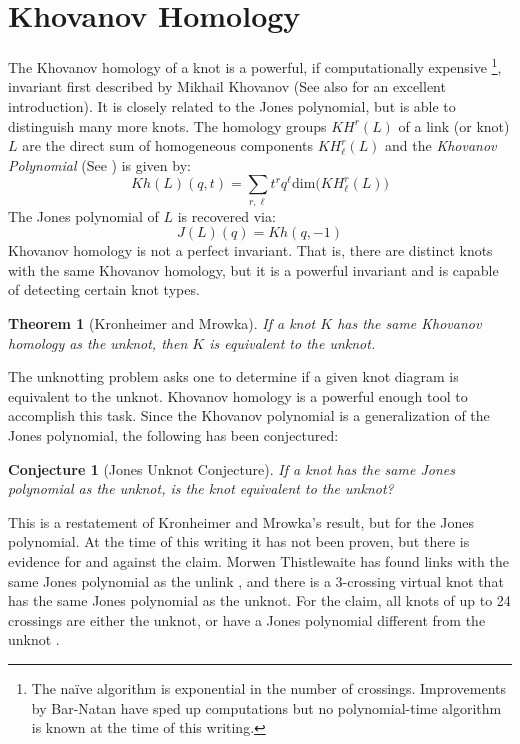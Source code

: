 \documentclass{article}
\theoremstyle{plain}
\newtheorem{theorem}{Theorem}
\newtheorem{conjecture}{Conjecture}
\begin{document}
	\section{Khovanov Homology}
	    The Khovanov homology of a knot is a powerful, if computationally
	    expensive%
	    \footnote{The na\"{i}ve algorithm is exponential in the number of
	    crossings. Improvements
	    by Bar-Natan \cite{Khovanov1999CatJonesPoly} have sped up computations
	    but no polynomial-time algorithm is known at the time of this writing.},
	    invariant first described by Mikhail Khovanov
	    \cite{Khovanov1999CatJonesPoly} (See also \cite{barnatan2002khovanov}
	    for an excellent introduction). It is closely related to the Jones
	    polynomial, but is able to distinguish many more knots. The homology
	    groups $KH^{r}(L)$ of a link (or knot) $L$ are the direct sum of
	    homogeneous components $KH_{\ell}^{r}(L)$ and the
	    \textit{Khovanov Polynomial} (See \cite{KatlasKhoHo}) is given by:
	    \begin{equation}
	        Kh(L)(q,t)=
	        \sum_{r,\ell}t^{r}q^{\ell}\textrm{dim}\big(KH_{\ell}^{r}(L)\big)
	    \end{equation}
	    The Jones polynomial of $L$ is recovered via:
	    \begin{equation}
	        J(L)(q)=Kh(q,-1)
	    \end{equation}
	    Khovanov homology is not a perfect invariant. That is, there are
	    distinct knots with the same Khovanov homology, but it is a powerful
	    invariant and is capable of detecting certain knot types.
	    \begin{theorem}[Kronheimer and Mrowka]
            If a knot $K$ has the same Khovanov homology as the unknot, then $K$
            is equivalent to the unknot.
	    \end{theorem}
	    The unknotting problem asks one to determine if a given knot diagram is
	    equivalent to the unknot. Khovanov homology is a powerful enough tool
	    to accomplish this task. Since the Khovanov polynomial is a
	    generalization of the Jones polynomial, the following has been
	    conjectured:
	    \begin{conjecture}[Jones Unknot Conjecture]
	        If a knot has the same Jones polynomial as the unknot, is the knot
	        equivalent to the unknot?
	    \end{conjecture}
	    This is a restatement of Kronheimer and Mrowka's result, but for the
	    Jones polynomial. At the time of this writing it has not been proven,
	    but there is evidence for and against the claim. Morwen Thistlewaite
	    has found links with the same Jones polynomial as the unlink
	    \cite{Thistlethwaite2001LINKSWT}, and there is a 3-crossing virtual
	    knot that has the same Jones polynomial as the unknot. For the claim,
	    all knots of up to 24 crossings are either the unknot, or have a
	    Jones polynomial different from the unknot
	    \cite{VerificationUnknotJonesConjUpTo24}.
\end{document}
